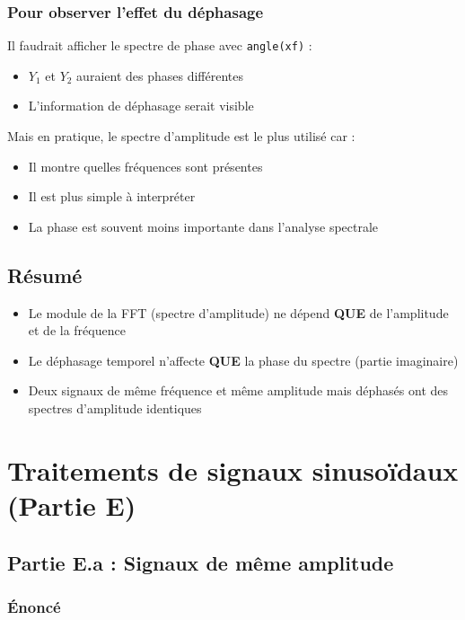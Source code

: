 \documentclass[12pt,a4paper]{article}
\begin{document}
\subsubsection{Pour observer l'effet du déphasage}

Il faudrait afficher le spectre de phase avec \texttt{angle(xf)} :
\begin{itemize}
    \item $Y_1$ et $Y_2$ auraient des phases différentes
    \item L'information de déphasage serait visible
\end{itemize}

Mais en pratique, le spectre d'amplitude est le plus utilisé car :
\begin{itemize}
    \item Il montre quelles fréquences sont présentes
    \item Il est plus simple à interpréter
    \item La phase est souvent moins importante dans l'analyse spectrale
\end{itemize}

\subsection{Résumé}

\begin{itemize}
    \item Le module de la FFT (spectre d'amplitude) ne dépend \textbf{QUE} de l'amplitude et de la fréquence
    \item Le déphasage temporel n'affecte \textbf{QUE} la phase du spectre (partie imaginaire)
    \item Deux signaux de même fréquence et même amplitude mais déphasés ont des spectres d'amplitude identiques
\end{itemize}

\newpage

\section{Traitements de signaux sinusoïdaux (Partie E)}

\subsection{Partie E.a : Signaux de même amplitude}

\subsubsection{Énoncé}
\end{document}
